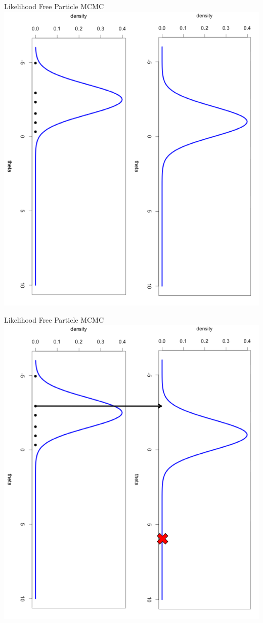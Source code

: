 \documentclass[12pt,a4paper,t,xcolor=dvipsnames,slidestop,compress,mathserif]{beamer}
\begin{document}
\begin{frame}{Likelihood Free Particle MCMC}
\includegraphics[scale=0.35]{prior_sample_graphic.png}
\end{frame}
\begin{frame}{Likelihood Free Particle MCMC}
\includegraphics[scale=0.35]{post_sample1_graphic.png}
\end{frame}
\end{document}
